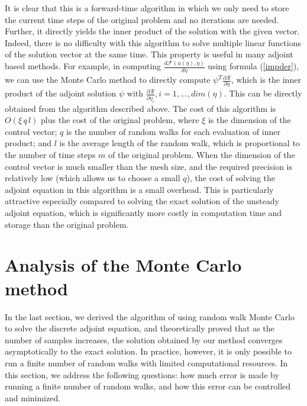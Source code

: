 \documentclass[a4paper,11pt]{article}
\theoremstyle{remark}
\theoremstyle{definition}
\begin{document}
        It is clear that this is a forward-time algorithm in which we only
        need to store the current time steps of the original problem and
        no iterations are needed.  Further, it directly yields the inner
        product of the solution with the given vector.  Indeed, there is no
        difficulty with this algorithm to solve multiple linear functions
        of the solution vector at the same time.  This property is useful
        in many adjoint based methods.  For example, in computing
        $ \frac{d\mathcal{F}(u(\eta),\eta)}{d\eta} $ using formula
        (\ref{impder}), we can use the Monte Carlo method to directly compute
        $ \psi^T \frac{\partial \mathcal{R}}{\partial \eta} $,
        which is the inner product of the adjoint solution $\psi$ with
        $\frac{\partial \mathcal{R}}{\partial \eta_i}, i=1,...,dim(\eta)$.
        This can be directly obtained from the algorithm described above.
        The cost of this algorithm is $O(\xi\, q\, l)$ plus the cost of
        the original problem, where $\xi$ is the dimension of the control
        vector; $q$ is the number of random walks for each evaluation of
        inner product; and $l$ is the average length of the random walk,
        which is proportional to the number of time steps $m$ of the original
        problem.  When the dimension of the control vector is much smaller
        than the mesh size, and the required precision is relatively low
        (which allows us to choose a small $q$), the cost of solving the
        adjoint equation in this algorithm is a small overhead.  This is
        particularly attractive especially compared to solving the exact
        solution of the unsteady adjoint equation, which is significantly
        more costly in computation time and storage than the original problem.
    


\section{Analysis of the Monte Carlo method}
    In the last section, we derived the algorithm of using random walk Monte
    Carlo to solve the discrete adjoint equation, and theoretically proved that
    as the number of samples increases, the solution obtained by our method
    converges asymptotically to the exact solution.  In practice, however,
    it is only possible to run a finite number of random walks with limited
    computational resources.  In this section, we address the following
    questions: how much error is made by running a finite number of random
    walks, and how this error can be controlled and minimized.
    
\end{document}
